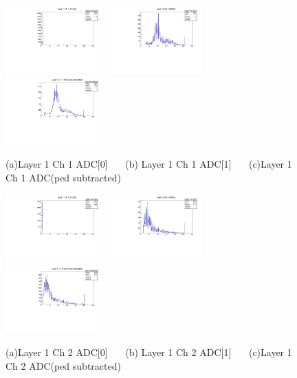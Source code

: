 \documentclass[a4paper,11pt]{article}
\theoremstyle{mytheor}
\begin{document}
\begin{figure}[H] 
\vspace*{-0.3cm} 
\includegraphics[width=0.33\textwidth,scale=0.5,trim=0 0 0 0,clip]{plotsdir/file0_muons-Layer1_Ch1_adc0-1.pdf} 
\includegraphics[width=0.33\textwidth,scale=0.5,trim=0 0 0 0,clip]{plotsdir/file0_muons-Layer1_Ch1_adc1-1.pdf} 
\includegraphics[width=0.33\textwidth,scale=0.5,trim=0 0 0 0,clip]{plotsdir/file0_muons-Layer1_Ch1_adcPedsub-1.pdf} 
\caption{(a)Layer 1 Ch 1 ADC[0] ~~~(b) Layer 1 Ch 1 ADC[1] ~~~(c)Layer 1 Ch 1 ADC(ped subtracted) } 
\end{figure} 
\begin{figure}[H] 
\vspace*{-0.3cm} 
\includegraphics[width=0.33\textwidth,scale=0.5,trim=0 0 0 0,clip]{plotsdir/file0_muons-Layer1_Ch2_adc0-1.pdf} 
\includegraphics[width=0.33\textwidth,scale=0.5,trim=0 0 0 0,clip]{plotsdir/file0_muons-Layer1_Ch2_adc1-1.pdf} 
\includegraphics[width=0.33\textwidth,scale=0.5,trim=0 0 0 0,clip]{plotsdir/file0_muons-Layer1_Ch2_adcPedsub-1.pdf} 
\caption{(a)Layer 1 Ch 2 ADC[0] ~~~(b) Layer 1 Ch 2 ADC[1] ~~~(c)Layer 1 Ch 2 ADC(ped subtracted) } 
\end{figure} 
\end{document}

